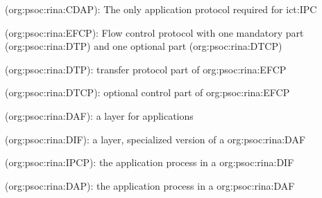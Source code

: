 \begin{description}[font=\normalfont,itemsep=0pt]
    \item[\acs{org:psoc:rina:CDAP}]
        (\acl{org:psoc:rina:CDAP}):
            The only application protocol required for \acs{ict:IPC}

    \item[\acs{org:psoc:rina:EFCP}]
        (\acl{org:psoc:rina:EFCP}):
            Flow control protocol with one mandatory part (\acs{org:psoc:rina:DTP}) and one optional part (\acs{org:psoc:rina:DTCP})

    \item[\acs{org:psoc:rina:DTP}]
        (\acl{org:psoc:rina:DTP}):
            transfer protocol part of \acs{org:psoc:rina:EFCP}

    \item[\acs{org:psoc:rina:DTCP}]
        (\acl{org:psoc:rina:DTCP}):
            optional control part of \acs{org:psoc:rina:EFCP}


    \item[\acs{org:psoc:rina:DAF}]
        (\acl{org:psoc:rina:DAF}):
            a layer for applications

    \item[\acs{org:psoc:rina:DIF}]
        (\acl{org:psoc:rina:DIF}):
            a layer, specialized version of a \acs{org:psoc:rina:DAF}


    \item[\acs{org:psoc:rina:IPCP}]
        (\acl{org:psoc:rina:IPCP}):
            the application process in a \acs{org:psoc:rina:DIF}

    \item[\acs{org:psoc:rina:DAP}]
        (\acl{org:psoc:rina:DAP}):
            the application process in a \acs{org:psoc:rina:DAF}


\end{description}